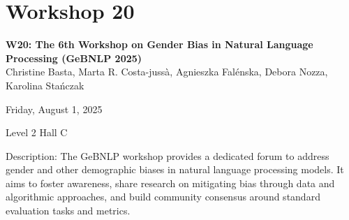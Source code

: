 \clearpage


\section[W20: The 6th Workshop on Gender Bias in Natural Language Processing (GeBNLP 2025)]{Workshop 20}
\label{workshop_20}

\begin{center}
    {\Large \textbf{W20: The 6th Workshop on Gender Bias in Natural Language Processing (GeBNLP 2025)}}\\
    

Christine Basta, Marta R. Costa-jussà, Agnieszka Falénska, Debora Nozza, Karolina Stańczak

    Friday, August 1, 2025
    
 Level 2 Hall C
\end{center}

Description: The GeBNLP workshop provides a dedicated forum to address gender and other demographic biases in natural language processing models. It aims to foster awareness, share research on mitigating bias through data and algorithmic approaches, and build community consensus around standard evaluation tasks and metrics.

